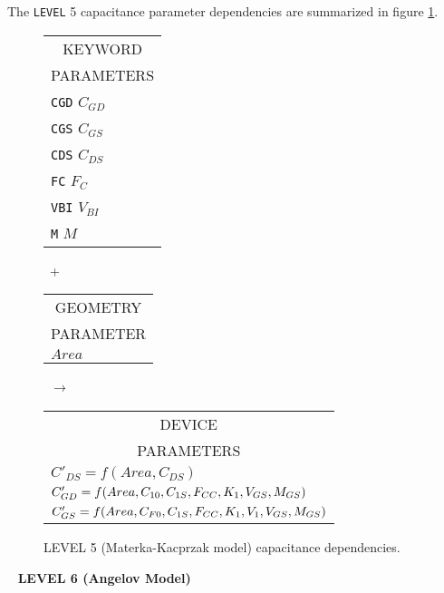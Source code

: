 The {\tt LEVEL} 5 capacitance parameter dependencies are summarized in figure
\ref{blevel5cap}.\\[0.2in]
\begin{figure}[h]
\begin{tabular}[t]{|p{1in}|}
\hline
\multicolumn{1}{|c|}{KEYWORD} \\
\multicolumn{1}{|c|}{PARAMETERS} \\
\hline
\hline
{\tt CGD} \hfill $C_{GD}$\\
{\tt CGS} \hfill $C_{GS}$\\
{\tt CDS} \hfill $C_{DS}$\\
{\tt FC} \hfill $F_C$\\
{\tt VBI} \hfill $V_{BI}$\\
{\tt M} \hfill $M$\\
\hline
\end{tabular}
\hfill
\parbox{0.2in}{\ \vspace*{0.2in}\newline +}
\hfill
\begin{tabular}[t]{|p{1in}|}
\hline
\multicolumn{1}{|c|}{GEOMETRY} \\
\multicolumn{1}{|c|}{PARAMETER} \\
\hline
\hspace*{\fill}$Area$\\
\hline
\end{tabular}
\hfill
\parbox{0.2in}{\ \vspace*{0.2in}\newline $\rightarrow$}
\hfill
\begin{tabular}[t]{|p{1.8in}|}
\hline
\multicolumn{1}{|c|}{DEVICE} \\
\multicolumn{1}{|c|}{PARAMETERS} \\
\hline
$C'_{DS} = f(Area, C_{DS})$\\
$C'_{GD} = f(Area, C_{10}, C_{1S},
            \newline\hspace*{\fill} F_{CC}, K_1, V_{GS}, M_{GS})$\\
$C'_{GS} = f(Area, C_{F0}, C_{1S},
            \newline\hspace*{\fill} F_{CC}, K_1, V_1, V_{GS}, M_{GS})$\\
\hline
\end{tabular}
\caption{LEVEL 5 (Materka-Kacprzak model) capacitance dependencies.
\label{blevel5cap}}
\end{figure}

\ \myThickLine
\label{b:level6:start}
{\bf LEVEL 6 (Angelov Model)}\myline

